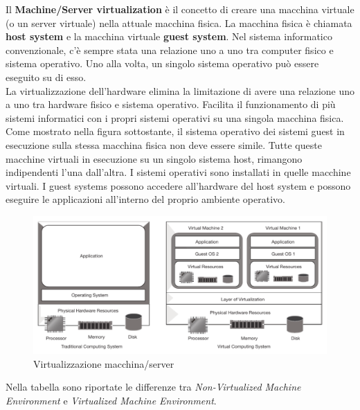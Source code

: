 \documentclass{article}
\begin{document}
Il \textbf{Machine/Server virtualization} è il concetto di creare una macchina virtuale (o un server virtuale) nella attuale macchina fisica. La macchina fisica è chiamata \textbf{host system} e la macchina virtuale \textbf{guest system}. Nel sistema informatico convenzionale, c'è sempre stata una relazione uno a uno tra computer fisico e sistema operativo. Uno alla volta, un singolo sistema operativo può essere eseguito su di esso. \\
La virtualizzazione dell'hardware elimina la limitazione di avere una relazione uno a uno tra hardware fisico e sistema operativo. Facilita il funzionamento di più sistemi informatici con i propri sistemi operativi su una singola macchina fisica. Come mostrato nella figura sottostante, il sistema operativo dei sistemi guest in esecuzione sulla stessa macchina fisica non deve essere simile. Tutte queste macchine virtuali in esecuzione su un singolo sistema host, rimangono indipendenti l'una dall'altra. I sistemi operativi sono installati in quelle macchine virtuali. I guest systems possono accedere all'hardware del host system e possono eseguire le applicazioni all'interno del proprio ambiente operativo. 
\begin{figure}[H]
    \centering
    \includegraphics[scale=0.5]{img/machine-server virtualizzation.png}
    \caption{Virtualizzazione macchina/server}
\end{figure}\noindent
Nella tabella sono riportate le differenze tra \textit{Non-Virtualized Machine Environment} e \textit{Virtualized Machine Environment}. \\
\end{document}
